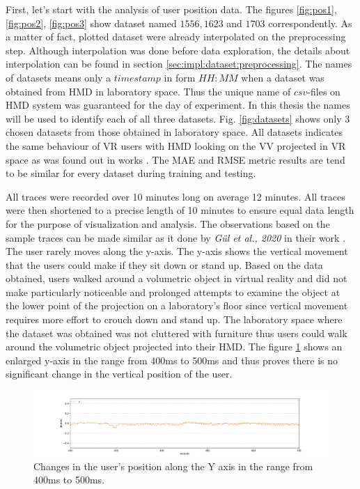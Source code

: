 First, let's start with the analysis of user position data. The figures \ref{fig:pos1}, \ref{fig:pos2}, \ref{fig:pos3} show dataset named $1556, 1623$ and $1703$ correspondently. As a matter of fact, plotted dataset were already interpolated on the preprocessing step. Although interpolation was done before data exploration, the details about interpolation can be found in section \ref*{sec:impl:dataset:preprocessing}. The names of datasets means only a $timestamp$ in form $HH:MM$ when a dataset was obtained from HMD in laboratory space. Thus the unique name of $csv$-files on HMD system was guaranteed for the day of experiment. In this thesis the names will be used to identify each of all three datasets. Fig. \ref{fig:datasets} shows only 3 chosen datasets from those obtained in laboratory space. All datasets indicates the same behaviour of VR users with HMD looking on the VV projected in VR space as was found out in works \cite{serhan_kalman, user_behav_volumetric}. The MAE and RMSE metric results are tend to be similar for every dataset during training and testing.

All traces were recorded over 10 minutes long on average 12 minutes. All traces were then shortened to a precise length of 10 minutes to ensure equal data length for the purpose of visualization and analysis. The observations based on the sample traces can be made similar as it done by \textit{Gül et al., 2020} in their work \cite{serhan_kalman}. The user rarely moves along the y-axis. The y-axis shows the vertical movement that the users could make if they sit down or stand up. Based on the data obtained, users walked around a volumetric object in virtual reality and did not make particularly noticeable and prolonged attempts to examine the object at the lower point of the projection on a laboratory's floor since vertical movement requires more effort to crouch down and stand up. The laboratory space where the dataset was obtained was not cluttered with furniture thus users could walk around the volumetric object projected into their HMD. The figure \ref{fig:y_pos} shows an enlarged y-axis in the range from 400ms to 500ms and thus proves there is no significant change in the vertical position of the user.

\begin{figure}[htb]
	\begin{center}
		\includegraphics[width=1\textwidth, keepaspectratio]{gfx/Fig-1556-y_position.pdf}
		\caption{\label{fig:y_pos} Changes in the user's position along the Y axis in the range from 400ms to 500ms.}
	\end{center}
\end{figure}

